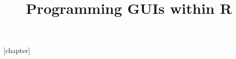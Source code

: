 \newcommand{\TITLE}{Programming GUIs within R}
\title{\TITLE}
\newcommand{\PACKAGENAME}{ProgGUIInR}
\newcommand{\WINDOZE}{Windows}
\newcommand{\UNIX}{Unix}
\newcommand{\LINUX}{Linux}
\newcommand{\OSX}{Mac OS X}


\usepackage{color}




\usepackage{fancyvrb}
\usepackage{multicol}          %

\usepackage{prelim2e}           %
\renewcommand{\PrelimWords}{Draft version, do not circulate}


\usepackage{lscape}             %


\usepackage{natbib}

\newcommand{\warning}[1]{Warning #1}
\newcommand{\aside}[1]{Aside #1}



[chapter]
\def\theExample {\thechapter.\arabic{Example}}
\setcounter{Example}{1}

\newenvironment{example}[2]{
  \refstepcounter{Example} 
  \vspace{12pt}
  \noindent
  \textbf{Example \theExample: #1}
  \label{#2}
  \newline
}{
}



